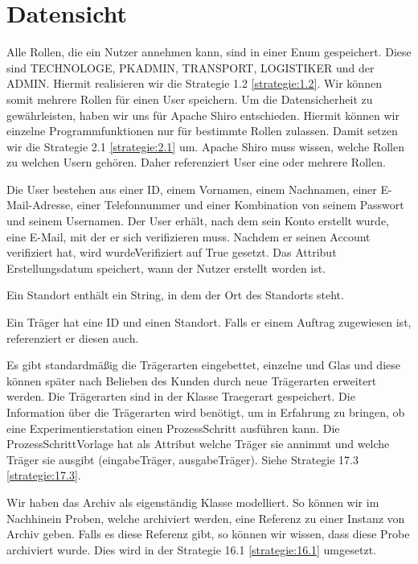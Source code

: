 \documentclass[enabledeprecatedfontcommands,fontsize=12pt,paper=a4,twoside]{scrartcl}
\begin{document}
\section{Datensicht}
\label{sec:datensicht}

{

Alle Rollen, die ein Nutzer annehmen kann, sind in einer Enum gespeichert. Diese
sind TECHNOLOGE, PKADMIN, TRANSPORT, LOGISTIKER und der ADMIN. Hiermit
realisieren wir die Strategie 1.2 \ref{strategie:1.2}. Wir können somit mehrere Rollen für einen
User speichern. Um die Datensicherheit zu gewährleisten, haben wir uns für
Apache Shiro entschieden. Hiermit können wir einzelne Programmfunktionen nur
für bestimmte Rollen zulassen. Damit setzen wir die Strategie 2.1 \ref{strategie:2.1} um. Apache
Shiro muss wissen, welche Rollen zu welchen Usern gehören. Daher referenziert
User eine oder mehrere Rollen.


Die User bestehen aus einer ID, einem Vornamen, einem Nachnamen, einer E-Mail-Adresse,
einer Telefonnummer und einer Kombination von seinem Passwort und seinem Usernamen.
Der User erhält, nach dem sein Konto erstellt wurde, eine E-Mail, mit der er sich verifizieren muss. Nachdem er seinen
Account verifiziert hat, wird wurdeVerifiziert auf True gesetzt. Das Attribut
Erstellungsdatum speichert, wann der Nutzer erstellt worden ist.

Ein Standort enthält ein String, in dem der Ort des Standorts steht.

Ein Träger hat eine ID und einen Standort. Falls er einem Auftrag zugewiesen ist,
referenziert er diesen auch.

Es gibt standardmäßig die Trägerarten eingebettet, einzelne und Glas und diese können später nach Belieben des Kunden durch neue Trägerarten erweitert werden. Die Trägerarten sind in
der Klasse Traegerart gespeichert. Die Information über die Trägerarten wird
benötigt, um in Erfahrung zu bringen, ob eine Experimentierstation einen
ProzessSchritt ausführen kann. Die ProzessSchrittVorlage hat als Attribut welche
Träger sie annimmt und welche Träger sie ausgibt (eingabeTräger, ausgabeTräger).
Siehe Strategie 17.3 \ref{strategie:17.3}.

Wir haben das Archiv als eigenständig Klasse modelliert. So können wir im
Nachhinein Proben, welche archiviert werden, eine Referenz zu einer Instanz von
Archiv geben. Falls es diese Referenz gibt, so können wir wissen, dass diese
Probe archiviert wurde. Dies wird in der Strategie 16.1 \ref{strategie:16.1} umgesetzt.

}
\end{document}
